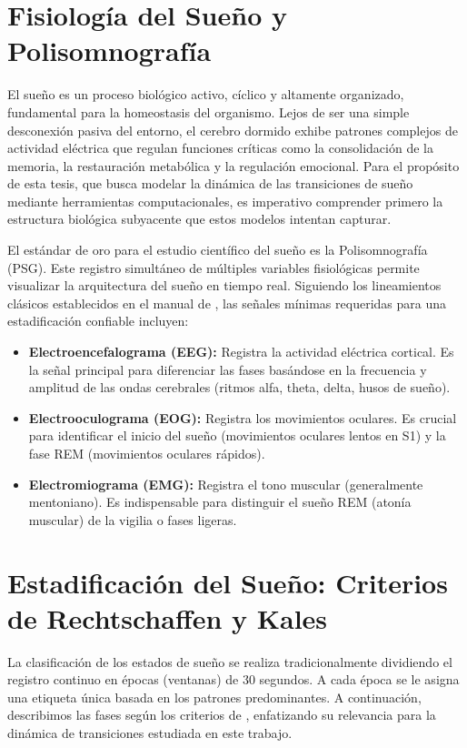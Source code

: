 \section{Fisiología del Sueño y Polisomnografía}

El sueño es un proceso biológico activo, cíclico y altamente organizado, fundamental para la homeostasis del organismo. Lejos de ser una simple desconexión pasiva del entorno, el cerebro dormido exhibe patrones complejos de actividad eléctrica que regulan funciones críticas como la consolidación de la memoria, la restauración metabólica y la regulación emocional. Para el propósito de esta tesis, que busca modelar la dinámica de las transiciones de sueño mediante herramientas computacionales, es imperativo comprender primero la estructura biológica subyacente que estos modelos intentan capturar.

El estándar de oro para el estudio científico del sueño es la Polisomnografía (PSG). Este registro simultáneo de múltiples variables fisiológicas permite visualizar la arquitectura del sueño en tiempo real. Siguiendo los lineamientos clásicos establecidos en el manual de \cite{rechtschaffen1968manual}, las señales mínimas requeridas para una estadificación confiable incluyen:
\begin{itemize}
    \item \textbf{Electroencefalograma (EEG):} Registra la actividad eléctrica cortical. Es la señal principal para diferenciar las fases basándose en la frecuencia y amplitud de las ondas cerebrales (ritmos alfa, theta, delta, husos de sueño).
    \item \textbf{Electrooculograma (EOG):} Registra los movimientos oculares. Es crucial para identificar el inicio del sueño (movimientos oculares lentos en S1) y la fase REM (movimientos oculares rápidos).
    \item \textbf{Electromiograma (EMG):} Registra el tono muscular (generalmente mentoniano). Es indispensable para distinguir el sueño REM (atonía muscular) de la vigilia o fases ligeras.
\end{itemize}

\section{Estadificación del Sueño: Criterios de Rechtschaffen y Kales}

La clasificación de los estados de sueño se realiza tradicionalmente dividiendo el registro continuo en épocas (ventanas) de 30 segundos. A cada época se le asigna una etiqueta única basada en los patrones predominantes. A continuación, describimos las fases según los criterios de \cite{rechtschaffen1968manual}, enfatizando su relevancia para la dinámica de transiciones estudiada en este trabajo.

